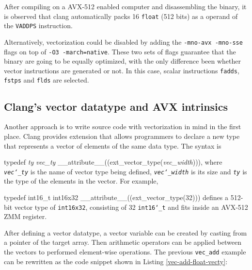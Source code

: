 \documentclass[logo,bsc,singlespacing,parskip]{infthesis}
\newcommand{\dtfloat}{\texttt{float} }
\newenvironment{VerbatimCompact}
  {\vspace*{-2.5mm}\VerbatimEnvironment
   \par\Verbatim}
  {\endVerbatim\vspace*{-2.4mm}}
\begin{document}
After compiling on a AVX-512 enabled computer and disassembling the binary, it
is observed that clang automatically packs 16 \dtfloat (512 bits) as a
operand of the \texttt{VADDPS} instruction. 

Alternatively, vectorization could be disabled by adding the \texttt{-mno-avx
-mno-sse} flags on top of \texttt{-O3 -march=native}. These two sets of flags
guarantee that the binary are going to be equally optimized, with the only
difference been whether vector instructions are generated or not. In this case,
scalar instructions \texttt{fadds}, \texttt{fstps} and \texttt{flds} are
selected.


\subsection{Clang's vector datatype and AVX intrinsics}

Another approach is to write source code with vectorization in mind in the first
place. Clang provides extension that allows programmers to declare a new type
that represents a vector of elements of the same data type. The syntax is 
\begin{VerbatimCompact}[commandchars=\\\{\}]
typedef \textit{ty} \textit{vec_ty} __attribute__((ext_vector_type(\textit{vec_width}))), 
\end{VerbatimCompact}
where \textit{\texttt{vec\char`_ty}} is the name of vector type being defined,
\textit{\texttt{vec\char`_width}} is its size and \textit{\texttt{ty}} is the
type of the elements in the vector. For example, 
\begin{VerbatimCompact}[commandchars=\\\{\}]
typedef int16_t int16x32 __attribute__((ext_vector_type(32)))
\end{VerbatimCompact}
defines a 512-bit vector type of \texttt{int16x32}, consisting of 32
\texttt{int16\char`_t} and fits inside an AVX-512 ZMM register. 

After defining a vector datatype, a vector variable can be created by casting
from a pointer of the target array. Then arithmetic operators can be applied
between the vectors to performed element-wise operations. The previous
\texttt{vec\_add} example can be rewritten as the code snippet shown in Listing
\ref{vec-add-float-vecty}:
\end{document}
